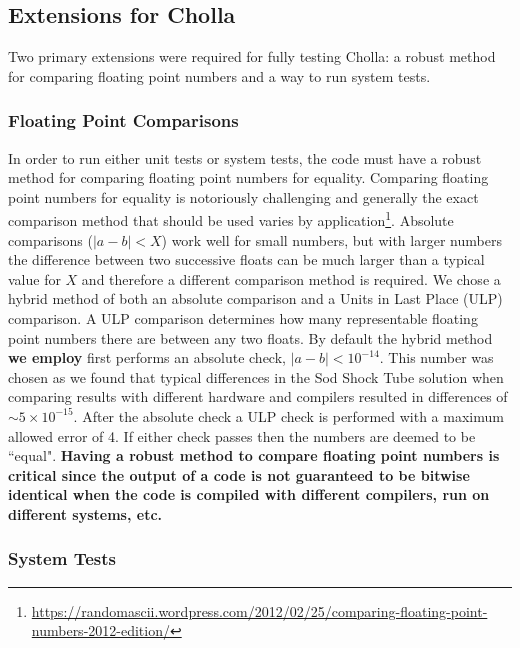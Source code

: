 \documentclass[modern, linenumbers]{aastex631}
\begin{document}
\subsection{Extensions for Cholla}

Two primary extensions were required for fully testing Cholla: a robust method for comparing floating point numbers and a way to run system tests.

\subsubsection{Floating Point Comparisons}
\label{sec:fp-comparing}

In order to run either unit tests or system tests, the code must have a robust method for comparing floating point numbers for equality. Comparing floating point numbers for equality is notoriously challenging and generally the exact comparison method that should be used varies by application\textbf{\citep{goldberg_1991,muller_2018}}\footnote{\url{https://randomascii.wordpress.com/2012/02/25/comparing-floating-point-numbers-2012-edition/}}. Absolute comparisons ($|a-b| < X$) work well for small numbers, but with larger numbers the difference between two successive floats can be much larger than a typical value for $X$ and therefore a different comparison method is required. We chose a hybrid method of both an absolute comparison and a Units in Last Place (ULP) comparison. A ULP comparison determines how many representable floating point numbers there are between any two floats. By default the hybrid method \textbf{we employ} first performs an absolute check, $|a-b| < 10^{-14}$. This number was chosen as we found that typical differences in the Sod Shock Tube solution when comparing results with different hardware and compilers resulted in differences of $\sim5\times10^{-15}$. After the absolute check a ULP check is performed with a maximum allowed error of 4. If either check passes then the numbers are deemed to be ``equal". \textbf{Having a robust method to compare floating point numbers is critical since the output of a code is not guaranteed to be bitwise identical when the code is compiled with different compilers, run on different systems, etc.}

\subsubsection{System Tests}
\end{document}
